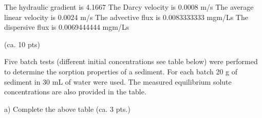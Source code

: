 \documentclass[letterpaper,10pt,english]{sphinxmanual}
\begin{document}
\begin{sphinxVerbatim}[commandchars=\\\{\}]
 
 
 
 
 
\end{sphinxVerbatim}

\begin{sphinxVerbatim}[commandchars=\\\{\}]
The hydraulic gradient is 4.1667 
The Darcy velocity is 0.0008 m/s
The average linear velocity is 0.0024 m/s
The advective flux is 0.0083333333 mg\PYGZhy{}m/L\PYGZhy{}s
The dispersive flux is 0.0069444444 mg\PYGZhy{}m/L\PYGZhy{}s
\end{sphinxVerbatim}

 (ca. 10 pts)

Five batch tests (different initial concentrations \textendash{} see table below) were performed to determine the sorption properties of a sediment. For each batch 20 g of sediment in 30 mL of water were used. The measured equilibrium solute concentrations are also provided in the table.

a)	Complete the above table								(ca. 3 pts.)
\end{document}
